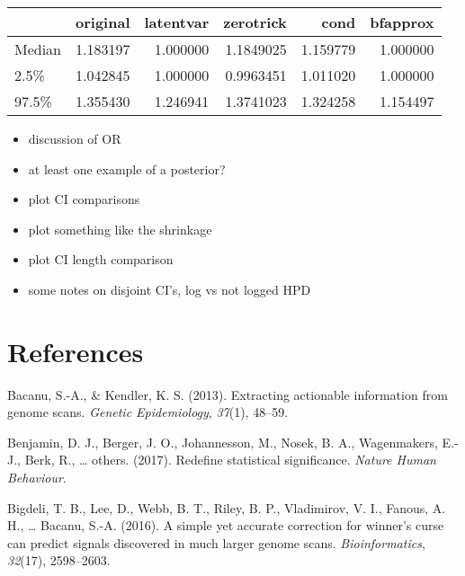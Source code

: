 \documentclass[12pt,twoside]{dukestatscithesis}
\providecommand{\tightlist}{%
  \setlength{\itemsep}{0pt}\setlength{\parskip}{0pt}}
\theoremstyle{definition}
\theoremstyle{definition}
\theoremstyle{definition}
\theoremstyle{remark}
\begin{document}
\begin{tabular}{l|r|r|r|r|r}
\hline
  & original & latentvar & zerotrick & cond & bfapprox\\
\hline
Median & 1.183197 & 1.000000 & 1.1849025 & 1.159779 & 1.000000\\
\hline
2.5\% & 1.042845 & 1.000000 & 0.9963451 & 1.011020 & 1.000000\\
\hline
97.5\% & 1.355430 & 1.246941 & 1.3741023 & 1.324258 & 1.154497\\
\hline
\end{tabular}
\begin{itemize}
\tightlist
\item
  discussion of OR
\item
  at least one example of a posterior?
\item
  plot CI comparisons
\item
  plot something like the shrinkage
\item
  plot CI length comparison
\item
  some notes on disjoint CI's, log vs not logged HPD
\end{itemize}
\backmatter

\chapter*{References}\label{references}


\noindent

\setlength{\parindent}{-0.20in} \setlength{\leftskip}{0.20in}
\setlength{\parskip}{8pt}

\hypertarget{refs}{}
\hypertarget{ref-bacanu2013extracting}{}
Bacanu, S.-A., \& Kendler, K. S. (2013). Extracting actionable
information from genome scans. \emph{Genetic Epidemiology},
\emph{37}(1), 48--59.

\hypertarget{ref-benjamin2017redefine}{}
Benjamin, D. J., Berger, J. O., Johannesson, M., Nosek, B. A.,
Wagenmakers, E.-J., Berk, R., \ldots{} others. (2017). Redefine
statistical significance. \emph{Nature Human Behaviour}.

\hypertarget{ref-bigdeli2016simple}{}
Bigdeli, T. B., Lee, D., Webb, B. T., Riley, B. P., Vladimirov, V. I.,
Fanous, A. H., \ldots{} Bacanu, S.-A. (2016). A simple yet accurate
correction for winner's curse can predict signals discovered in much
larger genome scans. \emph{Bioinformatics}, \emph{32}(17), 2598--2603.
\end{document}
